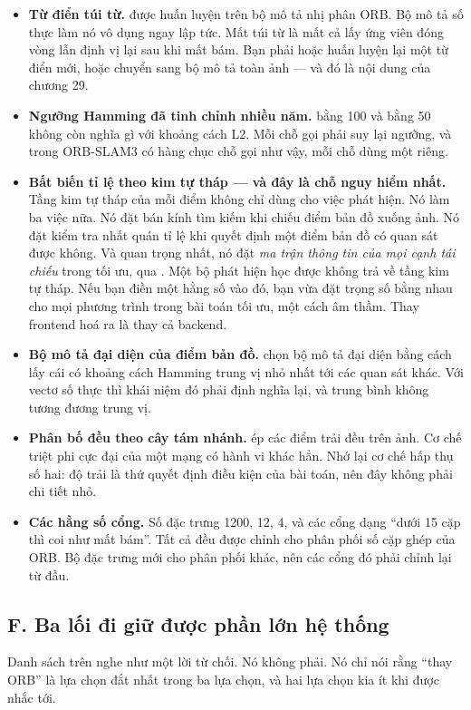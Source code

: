 \documentclass[../../deep_learning.tex]{subfiles}
\begin{document}
\begin{itemize}
\item \textbf{Từ điển túi từ.}  được huấn luyện trên bộ mô tả nhị phân ORB. Bộ mô tả số thực làm nó vô dụng ngay lập tức. Mất túi từ là mất cả lấy ứng viên đóng vòng lẫn định vị lại sau khi mất bám. Bạn phải hoặc huấn luyện lại một từ điển mới, hoặc chuyển sang bộ mô tả toàn ảnh --- và đó là nội dung của chương 29.
\item \textbf{Ngưỡng Hamming đã tinh chỉnh nhiều năm.}  bằng 100 và  bằng 50 không còn nghĩa gì với khoảng cách L2. Mỗi chỗ gọi phải suy lại ngưỡng, và trong ORB-SLAM3 có hàng chục chỗ gọi như vậy, mỗi chỗ dùng một  riêng.
\item \textbf{Bất biến tỉ lệ theo kim tự tháp --- và đây là chỗ nguy hiểm nhất.} Tầng kim tự tháp của mỗi điểm không chỉ dùng cho việc phát hiện. Nó làm ba việc nữa. Nó đặt bán kính tìm kiếm khi chiếu điểm bản đồ xuống ảnh. Nó đặt kiểm tra nhất quán tỉ lệ khi quyết định một điểm bản đồ có quan sát được không. Và quan trọng nhất, nó đặt \emph{ma trận thông tin của mọi cạnh tái chiếu} trong tối ưu, qua . Một bộ phát hiện học được không trả về tầng kim tự tháp. Nếu bạn điền một hằng số vào đó, bạn vừa đặt trọng số bằng nhau cho mọi phương trình trong bài toán tối ưu, một cách âm thầm. Thay frontend hoá ra là thay cả backend.
\item \textbf{Bộ mô tả đại diện của điểm bản đồ.}  chọn bộ mô tả đại diện bằng cách lấy cái có khoảng cách Hamming trung vị nhỏ nhất tới các quan sát khác. Với vectơ số thực thì khái niệm đó phải định nghĩa lại, và trung bình không tương đương trung vị.
\item \textbf{Phân bố đều theo cây tám nhánh.}  ép các điểm trải đều trên ảnh. Cơ chế triệt phi cực đại của một mạng có hành vi khác hẳn. Nhớ lại cơ chế hấp thụ số hai: độ trải là thứ quyết định điều kiện của bài toán, nên đây không phải chi tiết nhỏ.
\item \textbf{Các hằng số cổng.} Số đặc trưng 1200,  12,  4, và các cổng dạng ``dưới 15 cặp thì coi như mất bám''. Tất cả đều được chỉnh cho phân phối số cặp ghép của ORB. Bộ đặc trưng mới cho phân phối khác, nên các cổng đó phải chỉnh lại từ đầu.
\end{itemize}

\subsection{F. Ba lối đi giữ được phần lớn hệ thống}
Danh sách trên nghe như một lời từ chối. Nó không phải. Nó chỉ nói rằng ``thay ORB'' là lựa chọn đắt nhất trong ba lựa chọn, và hai lựa chọn kia ít khi được nhắc tới.
\end{document}
